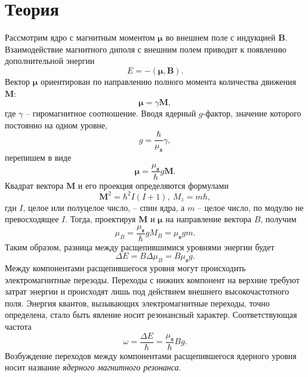 \documentclass[a4paper,12pt]{article}
\theoremstyle{definition}
\begin{document}
\section*{Теория}
Рассмотрим ядро с магнитным моментом $\boldsymbol{\mu}$ во внешнем поле с индукцией $\mathbf{B}$. Взаимодействие магнитного диполя с внешним полем приводит к появлению дополнительной энергии 
\[
E = -(\boldsymbol{\mu},\mathbf{B}).
\]
Вектор $\boldsymbol{\mu}$ ориентирован по направлению полного момента количества движения $\mathbf{M}$:
\[
\boldsymbol{\mu} = \gamma \mathbf{M},
\]
где $\gamma$ -- гиромагнитное соотношение. Вводя ядерный $g$-фактор, значение которого постоянно на одном уровне,
\[
g = \dfrac{\hbar}{\mu_\text{я}}\gamma,
\]
перепишем в виде
\[
\boldsymbol{\mu} = \dfrac{\mu_\text{я}}{\hbar}g\mathbf{M}.
\]
Квадрат вектора $\mathbf{M}$ и его проекция определяются формулами
\[
\mathbf{M}^2 = \hbar^2 I(I+1),~M_z = m\hbar,
\]
гдн $I$, целое или полуцелое число, -- спин ядра, а $m$ -- целое число, по модулю не превосходящее $I$. Тогда, проектируя $\mathbf{M}$ и $\boldsymbol{\mu}$ на направление вектора $B$, получим
\[
\mu_B = \dfrac{\mu_\text{я}}{\hbar}g M_B = \mu_\text{я} g m.
\]
Таким образом, разница между расщепившимися уровнями энергии будет
\[
\Delta E = B\Delta \mu_B = B \mu_\text{я} g.
\]
Между компонентами расщепившегося уровня могут происходить электромагнитные перезоды. Переходы с нижних компонент на верхние требуют затрат энергии и происходят лишь под действием внешнего высокочастотного поля. Энергия квантов, вызывающих электромагнитные переходы, точно определена, стало быть явление носит резонансный характер. Соответствующая частота 
\begin{equation}
\omega = \dfrac{\Delta E}{\hbar} = \dfrac{\mu_\text{я}}{\hbar}Bg.
\end{equation}
Возбуждение переходов между компонентами расщепившегося ядерного уровня носит название \textit{ядерного магнитного резонанса}.
\end{document}
